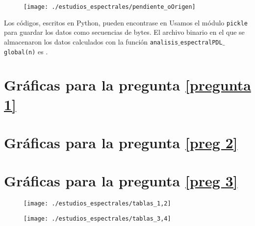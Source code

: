 \begin{figure}[H]
	\centering
	\texttt{[image: ./estudios\_espectrales/pendiente\_oOrigen]} 
\end{figure}	

Los códigos, escritos en Python, pueden encontrase en 
 Usamos el 
módulo \texttt{pickle} para guardar los datos como secuencias
de bytes. El archivo binario en el que se almacenaron los
datos calculados con la función 
\texttt{analisis$\_$espectralPDL$\_$global(n)}
es .

\section{Gráficas para la pregunta \ref{pregunta 1}}

\section{Gráficas para la pregunta \ref{preg 2}}

\section{Gráficas para la pregunta \ref{preg 3}}

\begin{figure}[H]
	\sidecaption{
	\label{fig: tablas_1,2}
	}
	\centering
	\texttt{[image: ./estudios\_espectrales/tablas\_1,2]} 
\end{figure}	

\begin{figure}[H]
	\sidecaption{
	\label{fig: tablas_1,2}
	}
	\centering
	\texttt{[image: ./estudios\_espectrales/tablas\_3,4]} 
\end{figure}	